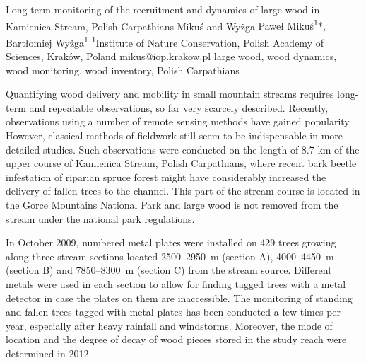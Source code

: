 
\abstract
{Long-term monitoring of the recruitment and dynamics of large wood in Kamienica Stream, Polish Carpathians} %
{Mikuś and Wyżga} %
{Paweł Mikuś\textsuperscript{1}*, Bartłomiej Wyżga\textsuperscript{1}} %
{\TLtag} %
{\textsuperscript{1}Institute of Nature Conservation, Polish Academy of Sciences, Kraków, Poland
} %
{mikus@iop.krakow.pl}  %
{large wood, wood dynamics, wood monitoring, wood inventory, Polish Carpathians}%
{Quantifying wood delivery and mobility in small mountain streams requires long-term and repeatable observations, so far very scarcely described. Recently, observations using a number of remote sensing methods have gained popularity. However, classical methods of fieldwork still seem to be indispensable in more detailed studies. Such observations were conducted on the length of 8.7 km of the upper course of Kamienica Stream, Polish Carpathians, where recent bark beetle infestation of riparian spruce forest might have considerably increased the delivery of fallen trees to the channel. This part of the stream course is located in the Gorce Mountains National Park and large wood is not removed from the stream under the national park regulations.

In October 2009, numbered metal plates were installed on 429 trees growing along three stream sections located 2500–2950~m (section A), 4000–4450~m (section B) and 7850–8300~m (section C) from the stream source. Different metals were used in each section to allow for finding tagged trees with a metal detector in case the plates on them are inaccessible. The monitoring of standing and fallen trees tagged with metal plates has been conducted a few times per year, especially after heavy rainfall and windstorms. Moreover, the mode of location and the degree of decay of wood pieces stored in the study reach were determined in 2012.

}
